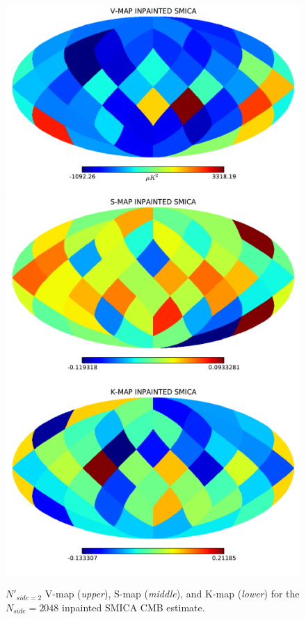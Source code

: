 \begin{figure}
\centering
\includegraphics[scale=0.4]{figures/chapter-vsk/vmap-inpainted-smica.pdf}\\
\includegraphics[scale=0.4]{figures/chapter-vsk/smap-inpainted-smica.pdf}\\
\includegraphics[scale=0.4]{figures/chapter-vsk/kmap-inpainted-smica.pdf}
\caption{$N'_{side = 2}$ V-map (\textit{upper}), S-map (\textit{middle}), and K-map (\textit{lower}) for the $N_{side} = 2048$ inpainted SMICA CMB estimate.}
\label{Fig:3}
\end{figure}

